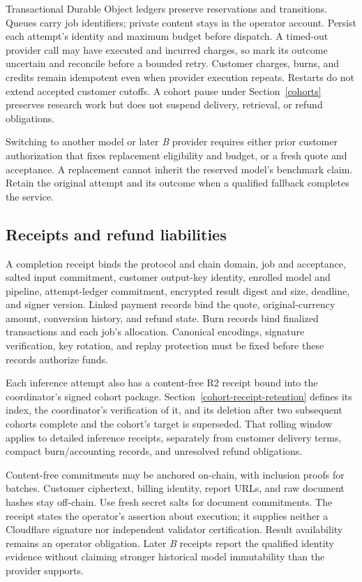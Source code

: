 Transactional Durable Object ledgers preserve reservations and transitions.
Queues carry job identifiers; private content stays in the operator account.
Persist each attempt's identity and maximum budget before dispatch. A timed-out
provider call may have executed and incurred charges, so mark its outcome
uncertain and reconcile before a bounded retry. Customer charges, burns, and
credits remain idempotent even when provider execution repeats. Restarts do
not extend accepted customer cutoffs. A cohort pause under
Section~\ref{cohorts} preserves research work but does not suspend delivery,
retrieval, or refund obligations.

Switching to another model or later \textit{B} provider requires either prior
customer authorization that fixes replacement eligibility and budget, or a
fresh quote and acceptance. A replacement cannot inherit the reserved model's
benchmark claim. Retain the original attempt and its outcome when a qualified
fallback completes the service.

\subsection{Receipts and refund liabilities}\label{receipt-certified-payment}
\label{payment-without-disclosing-the-job}

A completion receipt binds the protocol and chain domain, job and acceptance,
salted input commitment, customer output-key identity, enrolled model and
pipeline, attempt-ledger commitment, encrypted result digest and size,
deadline, and signer version. Linked payment records bind the quote,
original-currency amount, conversion history, and refund state. Burn records
bind finalized transactions and each job's allocation. Canonical encodings,
signature verification, key rotation, and replay protection must be fixed
before these records authorize funds.

Each inference attempt also has a content-free R2 receipt bound into the
coordinator's signed cohort package. Section~\ref{cohort-receipt-retention}
defines its index, the coordinator's verification of it, and its deletion after
two subsequent cohorts complete and the cohort's target is superseded. That rolling
window applies to detailed inference receipts, separately from customer delivery
terms, compact burn/accounting records, and unresolved refund obligations.

Content-free commitments may be anchored on-chain, with inclusion proofs for
batches. Customer ciphertext, billing identity, report URLs, and raw document
hashes stay off-chain. Use fresh secret salts for document commitments. The
receipt states the operator's assertion about execution; it supplies neither
a Cloudflare signature nor independent validator certification. Result
availability remains an operator obligation. Later \textit{B} receipts report
the qualified identity evidence without claiming stronger historical model
immutability than the provider supports.

